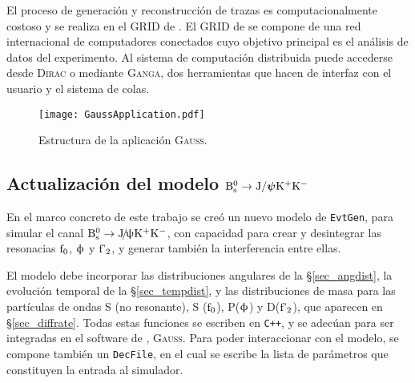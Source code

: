El proceso de generación y reconstrucción de trazas es computacionalmente costoso y se realiza en el GRID de \lhcb. 
El GRID de \lhcb se compone de una red internacional de computadores conectados cuyo objetivo principal es el análisis de datos del experimento. Al sistema de computación distribuida puede accederse desde \textsc{Dirac} o mediante \textsc{Ganga}, dos herramientas que hacen de interfaz con el usuario y el sistema de colas.





\begin{figure}[H]
\centering
\texttt{[image: GaussApplication.pdf]}
\caption{Estructura de la aplicación  \textsc{Gauss}.}	 \label{fig_gaussapp}
\end{figure}




\subsection[Modelo]{Actualización  del modelo $\text{B}{}_{\text{s}}^{\text{0}} \rightarrow \text{J}/\bm{\psi} \text{K}{}^{+}\text{K}{}^{-}$} %
\label{sec:Bs2JpsiKKmodel}

En el marco concreto  de este trabajo se creó un nuevo modelo de \texttt{EvtGen}, para simular el canal $\text{B}{}_{\text{s}}^{\text{0}} \rightarrow \text{J}\!/\!\uppsi \text{K}{}^{+}\text{K}{}^{-}$, con capacidad para crear y desintegrar las resonacias $\text{f}_0$, $\upphi$ y $\text{f'}_2$, y \color{vero} generar también la interferencia entre ellas. \color{norm} 

El modelo debe incorporar las distribuciones angulares de la \S \ref{sec_angdist}, la evolución temporal de la \S \ref{sec_tempdist}, y las distribuciones de masa para las partículas de ondas S (no resonante), S ($\text{f}_0$), P($\upphi$) y D($\text{f'}_2$), que aparecen en \S \ref{sec_diffrate}.  Todas estas funciones se escriben en \texttt{C++}, y se adecúan para ser integradas en el software de \lhcb, \textsc{Gauss}. Para poder interaccionar con el modelo, se compone también un \texttt{DecFile}, en el cual se escribe la lista de parámetros que constituyen la entrada al simulador.

